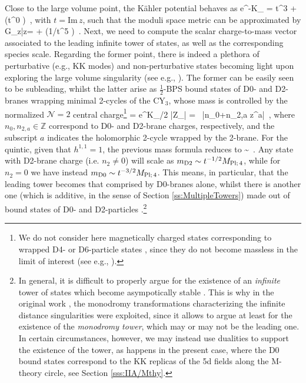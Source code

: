 Close to the large volume point, the K\"ahler potential behaves as \cite{Candelas:1990rm}
%
\beq\label{eq:KahlerpotLV}
	e^{-K_{}} = t^3 + \left(t^0 \right)\, ,
\eeq
%
with $t= \text{Im}\, z$, such that the moduli space metric can be approximated by
%
\beq\label{eq:quinticmetric}
	G_{z\bar z}=   + \left(1/t^5 \right)\, .
\eeq
%
Next, we need to compute the scalar charge-to-mass vector associated to the leading infinite tower of states, as well as the corresponding species scale. Regarding the former point, there is indeed a plethora of perturbative (e.g., KK modes) and non-perturbative states becoming light upon exploring the large volume singularity (see e.g., \cite{Font:2019cxq,Corvilain:2018lgw,Lee:2019wij}). The former can be easily seen to be subleading, whilst the latter arise as $\frac{1}{2}$-BPS bound states of D0- and D2-branes wrapping minimal 2-cycles of the CY$_3$, whose mass is controlled by the normalized $\mathcal{N}=2$ central charge\footnote{We do not consider here magnetically charged states corresponding to wrapped D4- or D6-particle states \cite{Ceresole:1995ca}, since they do not become massless in the limit of interest (see e.g., \cite{Font:2019cxq}).}
%
\beq\label{eq:centralcharge}
	 = \sqrt{8\pi } e^{K_{}/2} |Z_{}| = \, |n_0+n_{2,a} z^a|\, ,
\eeq
%
where $n_0, n_{2,a}\in \mathbb{Z}$ correspond to D0- and D2-brane charges, respectively, and the subscript $a$ indicates the holomorphic 2-cycle wrapped by the 2-brane. For the quintic, given that $h^{1,1}=1$, the previous mass formula reduces to
%
\beq\label{eq:centralchargequintic}
	 \sim {}\, .
\eeq
%
Any state with D2-brane charge (i.e. $n_2\neq 0$) will scale as $m_{\rm D2}\sim t^{-1/2}M_{\rm Pl;\, 4}$, while for $n_2=0$ we have instead $m_{\rm D0}\sim t^{-3/2}M_{\rm Pl;\, 4}$. This means, in particular, that the leading tower becomes that comprised by D0-branes alone, whilst there is another one (which is additive, in the sense of Section \ref{ss:MultipleTowers})  made out of bound states of D0- and D2-particles \cite{Corvilain:2018lgw}.\footnote{\label{fnote:stabilityBPS}In general, it is difficult to properly argue for the existence of an \emph{infinite} tower of states which become asympotically stable \cite{Grimm:2018ohb,Palti:2021ubp}. This is why in the original work \cite{Grimm:2018ohb}, the monodromy transformations characterizing the infinite distance singularities were exploited, since it allows to argue at least for the existence of the \emph{monodromy tower}, which may or may not be the leading one. In certain circumstances, however, we may instead use dualities to support the existence of the tower, as happens in the present case, where the D0 bound states correspond to the KK replicas of the 5d fields along the M-theory circle, see Section \ref{sss:IIA/Mthy}.}
	
